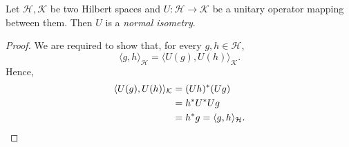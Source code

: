 \begin{prop}
 Let $\mathcal{H},\mathcal{K}$ be two Hilbert spaces and
 $U : \mathcal{H} \to \mathcal{K}$ be a unitary operator
 mapping between them. Then $U$ is a \emph{normal isometry}.
\end{prop}

\begin{proof}
 We are required to show that, for every $g,h \in \mathcal{H}$,
 \[
  \langle g, h \rangle_{\mathcal{H}}
  = \langle U(g), U(h) \rangle_{\mathcal{K}}.
 \]
 Hence,
 \begin{align*}
  \langle U(g), U(h) \rangle_{\mathcal{K}}
  &= (U h)^{*} (U g)
  \\
  &= h^{*} U^{*} U g
  \\
  &= h^{*} g = \langle g, h \rangle_{\mathcal{H}}. \qedhere
 \end{align*}
\end{proof}
